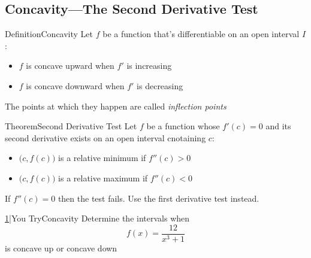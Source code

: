 \documentclass{MathNotes}
\newenvironment{definition}[1]{\begin{RedBox}{Definition}{#1}}{\end{RedBox}}
\newenvironment{theorem}[1]{\begin{GrayBox}{Theorem}{#1}}{\end{GrayBox}}
\newenvironment{practice}[2]{\begin{PurpleBox}{\texorpdfstring{#1}\Big|You Try}{#2}}{\end{PurpleBox}}
\begin{document}
\newpage

\subsection{Concavity---The Second Derivative Test}
\begin{multicols}{2}
	\begin{definition}{Concavity}
		Let $f$ be a function that's differentiable on an open interval $I$:
		\begin{itemize}
			\item $f$ is concave upward when $f'$ is increasing
			\item $f$ is concave downward when $f'$ is decreasing
		\end{itemize}
		The points at which they happen are called \textit{inflection points}
	\end{definition}
	\begin{center}
		
	\end{center}
\end{multicols}

\begin{theorem}{Second Derivative Test}
	Let $f$ be a function whose $f'(c)=0$ and its second derivative exists on an
	open interval cnotaining $c$:
	\begin{itemize}
		\item $\big(c, f(c)\big)$ is a relative minimum if $f''(c)>0$
		\item $\big(c, f(c)\big)$ is a relative maximum if $f''(c)<0$
	\end{itemize}
	If $f''(c)=0$ then the test fails. Use the first derivative test instead.
\end{theorem}

\begin{practice}{\hyperref[ans:3.4-1]{1}}{Concavity}
	\label{prac:3.4-1}
	Determine the intervals when \[f(x)=\frac{12}{x^3+1}\] is concave up
	or concave down
\end{practice}
\end{document}
